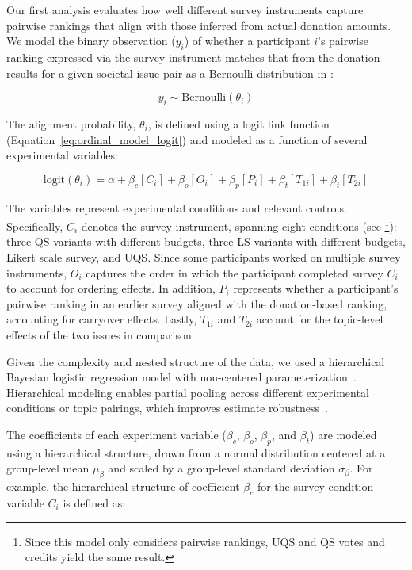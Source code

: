 Our first analysis evaluates how well different survey instruments capture pairwise rankings that align with those inferred from actual donation amounts. We model the binary observation ($y_i$) of whether a participant $i$'s pairwise ranking expressed via the survey instrument matches that from the donation results for a given societal issue pair as a Bernoulli distribution in :

\begin{equation}
    \label{eq:ordinal_model_overall}
    y_i \sim \text{Bernoulli}(\theta_i)
\end{equation}

The alignment probability, $\theta_i$, is defined using a logit link function (Equation~\ref{eq:ordinal_model_logit}) and modeled as a function of several experimental variables:

\begin{equation}
    \label{eq:ordinal_model_logit}
    \text{logit}(\theta_i) = \alpha + \beta_c[C_i] + \beta_o[O_i] + \beta_p[P_i] + \beta_t[T_{1i}] + \beta_t[T_{2i}]
\end{equation}

The variables represent experimental conditions and relevant controls. Specifically, $C_i$ denotes the survey instrument, spanning eight conditions (see \footnote{Since this model only considers pairwise rankings, UQS and QS votes and credits yield the same result.}): three QS variants with different budgets, three LS variants with different budgets, Likert scale survey, and UQS. Since some participants worked on multiple survey instruments, $O_i$ captures the order in which the participant completed survey $C_i$ to account for ordering effects. In addition, $P_i$ represents whether a participant’s pairwise ranking in an earlier survey aligned with the donation-based ranking, accounting for carryover effects. Lastly, $T_{1i}$ and $T_{2i}$ account for the topic-level effects of the two issues in comparison.

Given the complexity and nested structure of the data, we used a hierarchical Bayesian logistic regression model with non-centered parameterization~\cite{mcelreath2018statistical}. Hierarchical modeling enables partial pooling across different experimental conditions or topic pairings, which improves estimate robustness~\cite{mcelreath2018statistical}. 

The coefficients of each experiment variable ($\beta_{c}$, $\beta_{o}$, $\beta_{p}$, and $\beta_{t}$) are modeled using a hierarchical structure, drawn from a normal distribution centered at a group-level mean $\mu_{\beta}$ and scaled by a group-level standard deviation $\sigma_{\beta}$. For example, the hierarchical structure of coefficient $\beta_c$ for the survey condition variable $C_i$ is defined as: 


